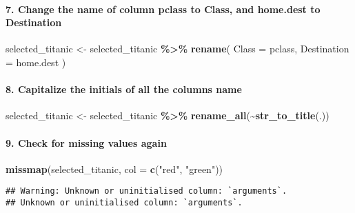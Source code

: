 \documentclass[
]{article}
\newenvironment{Shaded}{\begin{snugshade}}{\end{snugshade}}
\newcommand{\AttributeTok}[1]{\textcolor[rgb]{0.13,0.29,0.53}{#1}}
\newcommand{\FunctionTok}[1]{\textcolor[rgb]{0.13,0.29,0.53}{\textbf{#1}}}
\newcommand{\NormalTok}[1]{#1}
\newcommand{\OtherTok}[1]{\textcolor[rgb]{0.56,0.35,0.01}{#1}}
\newcommand{\SpecialCharTok}[1]{\textcolor[rgb]{0.81,0.36,0.00}{\textbf{#1}}}
\newcommand{\StringTok}[1]{\textcolor[rgb]{0.31,0.60,0.02}{#1}}
\begin{document}
\paragraph{7. Change the name of column pclass to Class, and home.dest
to
Destination}\label{change-the-name-of-column-pclass-to-class-and-home.dest-to-destination}

\begin{Shaded}
\begin{Highlighting}[]
\NormalTok{selected\_titanic }\OtherTok{\textless{}{-}}\NormalTok{ selected\_titanic }\SpecialCharTok{\%\textgreater{}\%} 
  \FunctionTok{rename}\NormalTok{(}
    \AttributeTok{Class =}\NormalTok{ pclass,}
    \AttributeTok{Destination =}\NormalTok{ home.dest}
\NormalTok{  )}
\end{Highlighting}
\end{Shaded}

\paragraph{8. Capitalize the initials of all the columns
name}\label{capitalize-the-initials-of-all-the-columns-name}

\begin{Shaded}
\begin{Highlighting}[]
\NormalTok{selected\_titanic }\OtherTok{\textless{}{-}}\NormalTok{ selected\_titanic }\SpecialCharTok{\%\textgreater{}\%} 
  \FunctionTok{rename\_all}\NormalTok{(}\SpecialCharTok{\textasciitilde{}}\FunctionTok{str\_to\_title}\NormalTok{(.))}
\end{Highlighting}
\end{Shaded}

\paragraph{9. Check for missing values
again}\label{check-for-missing-values-again}

\begin{Shaded}
\begin{Highlighting}[]
\FunctionTok{missmap}\NormalTok{(selected\_titanic, }\AttributeTok{col =} \FunctionTok{c}\NormalTok{(}\StringTok{"red"}\NormalTok{, }\StringTok{"green"}\NormalTok{))}
\end{Highlighting}
\end{Shaded}

\begin{verbatim}
## Warning: Unknown or uninitialised column: `arguments`.
## Unknown or uninitialised column: `arguments`.
\end{verbatim}
\end{document}
